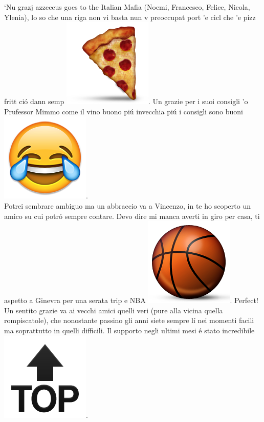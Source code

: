 \noindent `Nu grazj azzeccus goes to the Italian Mafia (Noemi, Francesco, Felice, Nicola, Ylenia), lo so che una riga non vi basta nun v preoccupat port 'e cicl che 'e pizz fritt ci\'o dann semp \includegraphics[height=1.5\fontcharht\font`A]{figures/ack/EmojiObjects/EmojiObjects-182.png}. Un grazie per i suoi consigli 'o Prufessor Mimmo come il vino buono pi\'u invecchia pi\'u i consigli sono buoni \includegraphics[height=1.5\fontcharht\font`A]{figures/ack/EmojiSmiley/EmojiSmiley-23.png}.\\ Potrei sembrare ambiguo ma un abbraccio va a Vincenzo, in te ho scoperto un amico su cui potr\'o sempre contare. Devo dire mi manca averti in giro per casa, ti aspetto a Ginevra per una serata trip e NBA \includegraphics[height=1.5\fontcharht\font`A]{figures/ack/EmojiObjects/EmojiObjects-154.png}. Perfect!\\  Un sentito grazie va ai vecchi amici quelli veri (pure alla vicina quella rompiscatole), che nonostante passino gli anni siete sempre l\'i nei momenti facili ma soprattutto in quelli difficili. Il supporto negli ultimi mesi \'e stato incredibile \includegraphics[height=1.5\fontcharht\font`A]{figures/ack/EmojiSymbols/EmojiSymbols-142.png}. \\



